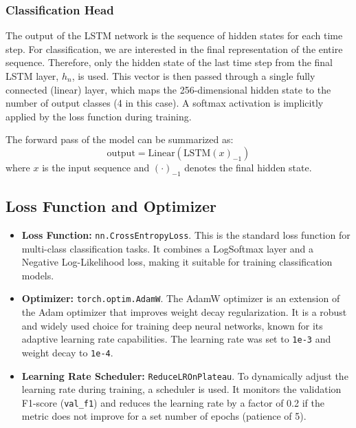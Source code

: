 \documentclass[11pt, a4paper]{article}
\begin{document}
\subsubsection{Classification Head}
The output of the LSTM network is the sequence of hidden states for each time step. For classification, we are interested in the final representation of the entire sequence. Therefore, only the hidden state of the last time step from the final LSTM layer, $h_n$, is used. This vector is then passed through a single fully connected (linear) layer, which maps the 256-dimensional hidden state to the number of output classes (4 in this case). A softmax activation is implicitly applied by the loss function during training.

The forward pass of the model can be summarized as:
\begin{equation}
    \text{output} = \text{Linear}(\text{LSTM}(x)_{-1})
\end{equation}
where $x$ is the input sequence and $(\cdot)_{-1}$ denotes the final hidden state.

\subsection{Loss Function and Optimizer}
\begin{itemize}
    \item \textbf{Loss Function:} \texttt{nn.CrossEntropyLoss}. This is the standard loss function for multi-class classification tasks. It combines a LogSoftmax layer and a Negative Log-Likelihood loss, making it suitable for training classification models.
    \item \textbf{Optimizer:} \texttt{torch.optim.AdamW}. The AdamW optimizer is an extension of the Adam optimizer that improves weight decay regularization. It is a robust and widely used choice for training deep neural networks, known for its adaptive learning rate capabilities. The learning rate was set to \texttt{1e-3} and weight decay to \texttt{1e-4}.
    \item \textbf{Learning Rate Scheduler:} \texttt{ReduceLROnPlateau}. To dynamically adjust the learning rate during training, a scheduler is used. It monitors the validation F1-score (\texttt{val\_f1}) and reduces the learning rate by a factor of 0.2 if the metric does not improve for a set number of epochs (patience of 5).
\end{itemize}
\end{document}
